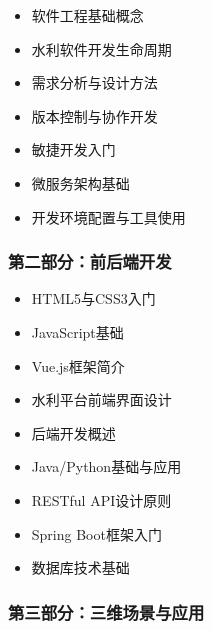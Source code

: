 \begin{itemize}
\tightlist
\item
  软件工程基础概念
\item
  水利软件开发生命周期
\item
  需求分析与设计方法
\end{itemize}


\begin{itemize}
\tightlist
\item
  版本控制与协作开发
\item
  敏捷开发入门
\item
  微服务架构基础
\item
  开发环境配置与工具使用
\end{itemize}

\hypertarget{ux7b2cux4e8cux90e8ux5206ux524dux540eux7aefux5f00ux53d1}{%
\subsubsection{第二部分：前后端开发}\label{ux7b2cux4e8cux90e8ux5206ux524dux540eux7aefux5f00ux53d1}}


\begin{itemize}
\tightlist
\item
  HTML5与CSS3入门
\item
  JavaScript基础
\item
  Vue.js框架简介
\item
  水利平台前端界面设计
\end{itemize}


\begin{itemize}
\tightlist
\item
  后端开发概述
\item
  Java/Python基础与应用
\item
  RESTful API设计原则
\item
  Spring Boot框架入门
\item
  数据库技术基础
\end{itemize}

\hypertarget{ux7b2cux4e09ux90e8ux5206ux4e09ux7ef4ux573aux666fux4e0eux5e94ux7528}{%
\subsubsection{第三部分：三维场景与应用}\label{ux7b2cux4e09ux90e8ux5206ux4e09ux7ef4ux573aux666fux4e0eux5e94ux7528}}

